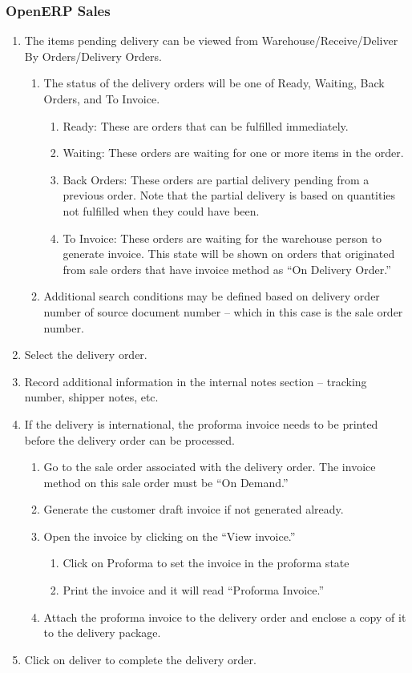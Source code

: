 \subsubsection{OpenERP Sales}
\begin{enumerate}
\item The items pending delivery can be viewed from Warehouse/Receive/Deliver By Orders/Delivery Orders. 
  \begin{enumerate}
  \item The status of the delivery orders will be one of Ready, Waiting, Back Orders, and To Invoice. 
    \begin{enumerate}
    \item Ready: These are orders that can be fulfilled immediately.
    \item Waiting: These orders are waiting for one or more items in the order.
    \item Back Orders: These orders are partial delivery pending from a previous order. Note that the partial delivery is based on quantities not fulfilled when they could have been.
    \item To Invoice: These orders are waiting for the warehouse person to generate invoice. This state will be shown on orders that originated from sale orders that have invoice method as “On Delivery Order.”
    \end{enumerate}
  \item Additional search conditions may be defined based on delivery order number of source document number – which in this case is the sale order number.
  \end{enumerate}
\item Select the delivery order.
\item Record additional information in the internal notes section – tracking number, shipper notes, etc.
\item If the delivery is international, the proforma invoice needs to be printed before the delivery order can be processed.
  \begin{enumerate}
  \item Go to the sale order associated with the delivery order. The invoice method on this sale order must be “On Demand.”
  \item Generate the customer draft invoice if not generated already.
  \item Open the invoice by clicking on the “View invoice.”
    \begin{enumerate}
    \item Click on Proforma to set the invoice in the proforma state
    \item Print the invoice and it will read “Proforma Invoice.”
    \end{enumerate}
  \item Attach the proforma invoice to the delivery order and enclose a copy of it to the delivery package.
  \end{enumerate}
\item Click on deliver to complete the delivery order.
\end{enumerate}

